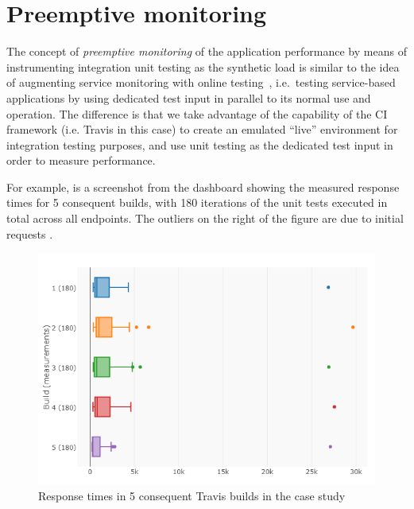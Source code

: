 \documentclass[conference]{IEEEtran}
\begin{document}
  \newpage
  \section{Preemptive monitoring}

  
  
  The concept of {\em preemptive monitoring} of the application performance by means of instrumenting integration unit testing as the synthetic load is similar to the idea of augmenting service monitoring with online testing~\cite{metzger2010proactive}, i.e.~testing service-based applications by using dedicated test input in parallel to its normal use and operation. The difference is that we take advantage of the capability of the CI framework (i.e. Travis in this case) to create an emulated ``live'' environment for integration testing purposes, and use unit testing as the dedicated test input in order to measure performance. 
  
  For example,  is a screenshot from the dashboard showing the measured response times for 5 consequent builds, with 180 iterations of the unit tests executed in total across all endpoints. The outliers on the right of the figure are due to initial requests .  


    \begin{figure}[h!]
        \centering
        \includegraphics[width=\columnwidth]{travis_builds}
        \caption{Response times in 5 consequent Travis builds in the \zee case study}
        \label{fig:builds}
      \end{figure}
\end{document}
